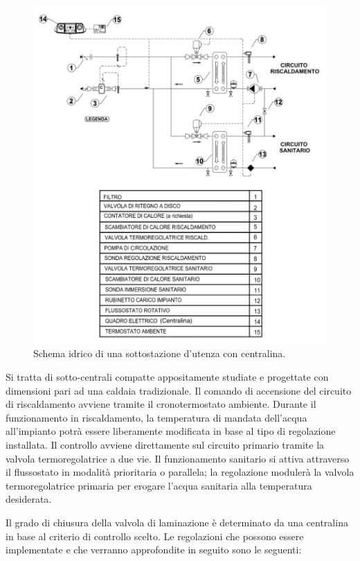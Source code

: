 \documentclass[laurea,oneside,11pt]{USiena_tesiLM3}
\begin{document}
\begin{figure}[!ht]
\centering
\includegraphics[width=\textwidth]{figure/schema_centralina2} 
\caption{Schema idrico di una sottostazione d'utenza con centralina.}
\label{fig:schema_centralina2}
\end{figure}

Si tratta di sotto-centrali compatte appositamente studiate e progettate con dimensioni pari ad una caldaia tradizionale.
Il comando di accensione del circuito di riscaldamento avviene tramite il cronotermostato ambiente. Durante il funzionamento in riscaldamento, la temperatura di mandata dell'acqua all'impianto potrà essere liberamente modificata in base al tipo di regolazione installata. Il controllo  avviene direttamente sul circuito primario tramite la valvola termoregolatrice a due vie.
Il funzionamento sanitario si attiva attraverso il flussostato in modalità prioritaria o parallela; la regolazione modulerà la valvola termoregolatrice primaria per erogare l’acqua sanitaria alla temperatura desiderata.

Il grado di chiusura della valvola di laminazione è determinato da una centralina in base al criterio di controllo scelto. Le regolazioni che possono essere implementate  e che verranno approfondite in seguito sono le seguenti:
\end{document}
